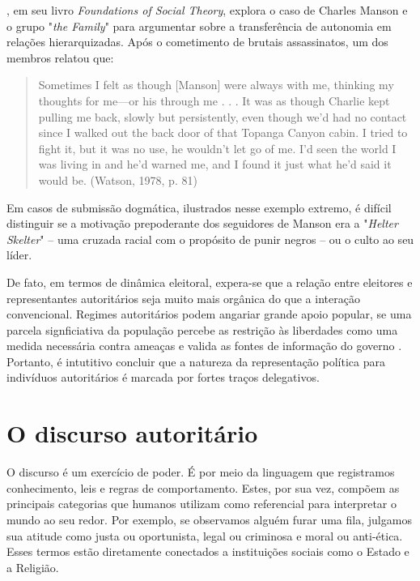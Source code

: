 \documentclass[
12pt,				%
openright,			%
twoside,			%
a4paper,			%
english,			%
french,				%
spanish,			%
brazil				%
]{abntex2}
\begin{document}
, em seu livro \emph{Foundations of Social Theory}, explora o caso de Charles Manson e o grupo "\emph{the Family}" para argumentar sobre a transferência de autonomia em relações hierarquizadas. Após o cometimento de brutais assassinatos, um dos membros relatou que:

\begin{quote}
	Sometimes I felt as though [Manson] were always with me, thinking my thoughts for me—or his through me . . . It was as though Charlie kept pulling me back, slowly but persistently, even though we’d had no contact since I walked out the back door of that Topanga Canyon cabin. I tried to fight it, but it was no use, he wouldn’t let go of me. I’d seen the world I was living in and he’d warned me, and I found it just what he’d said it would be. (Watson, 1978, p. 81)
\end{quote}

Em casos de submissão dogmática, ilustrados nesse exemplo extremo, é difícil distinguir se a motivação prepoderante dos seguidores de Manson era a "\emph{Helter Skelter}" -- uma cruzada racial com o propósito de punir negros -- ou o culto ao seu líder.

De fato, em termos de dinâmica eleitoral, expera-se que a relação entre eleitores e representantes autoritários seja muito mais orgânica do que a interação convencional. Regimes autoritários podem angariar grande apoio popular, se uma parcela signficiativa da população percebe as restrição às liberdades como uma medida necessária contra ameaças e valida as fontes de informação do governo \cite{geddes1989sources, stein2013unraveling}. Portanto, é intutitivo concluir que a natureza da representação política para indivíduos autoritários é marcada por fortes traços delegativos.

\section{O discurso autoritário}

O discurso é um exercício de poder. É por meio da linguagem que registramos conhecimento, leis e regras de comportamento. Estes, por sua vez, compõem as principais categorias que humanos utilizam como referencial para interpretar o mundo ao seu redor. Por exemplo, se observamos alguém furar uma fila, julgamos sua atitude como justa ou oportunista, legal ou criminosa e moral ou anti-ética. Esses termos estão diretamente conectados a instituições sociais como o Estado e a Religião. 
\end{document}
